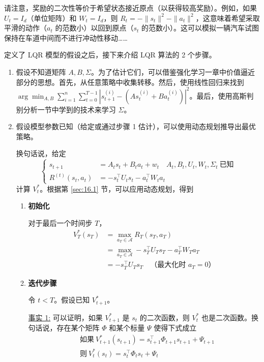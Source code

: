 \begin{remark*}
    请注意，奖励的二次性等价于希望状态接近原点（以获得较高奖励）。例如，如果 $U_t = I_d$（单位矩阵）和 $W_t = I_d$，则 $R_t = -\|s_t\|^2 - \|a_t\|^2$，这意味着希望采取平滑的动作（$a_t$ 的范数小）以回到原点（$s_t$ 的范数小）。这可以模拟一辆汽车试图保持在车道中间而不进行冲动性移动……
\end{remark*}

定义了 LQR 模型的假设之后，接下来介绍 LQR 算法的 2 个步骤。

\begin{enumerate}[label=\textbf{步骤 \arabic*}]
    \item 假设不知道矩阵 $A, B, \Sigma$。为了估计它们，可以借鉴强化学习一章中价值逼近部分的思想。首先，从任意策略中收集转移。然后，使用线性回归来找到 $\arg\min_{A,B} \sum_{i=1}^n \sum_{t=0}^{T-1} \left|s_{t+1}^{(i)} - \left(A s_t^{(i)} + B a_t^{(i)}\right)\right|^2$。最后，使用高斯判别分析一节中学到的技术来学习 $\Sigma$。
    \item 假设模型参数已知（给定或通过步骤 1 估计），可以使用动态规划推导出最优策略。
    
    换句话说，给定
    \[\begin{cases}
        s_{t+1} &= A_t s_t + B_t a_t + w_t \quad A_t, B_t, U_t, W_t, \Sigma_t \ \text{已知}\\
        R^{(t)}(s_t, a_t) &= -s_t^\top U_t s_t - a_t^\top W_t a_t
    \end{cases}\]
    计算 $V_t^*$。根据第 \ref{sec:16.1} 节，可以应用动态规划，得到
    \begin{enumerate}[label=\arabic*.]
        \item \textbf{初始化}
        
        对于最后一个时间步 $T$，
        \begin{align*}
            V_T^*(s_T)
            &= \max_{a_T \in \mathcal{A}} R_T(s_T, a_T) \\
            &= \max_{a_T \in \mathcal{A}} -s_T^\top U_T s_T - a_T^\top W_T a_T\\
            &= -s_T^\top U_T s_T \quad \text{（最大化时 $a_T=0$）}
        \end{align*}
            
        \item \textbf{迭代步骤}
        
        令 $t < T$。假设已知 $V_{t+1}^*$。

        \underline{事实 1:} 可以证明，如果 $V_{t+1}^*$ 是 $s_t$ 的二次函数，则 $V_t^*$ 也是二次函数。换句话说，存在某个矩阵 $\Phi$ 和某个标量 $\Psi$ 使得下式成立
        \begin{align*}
            &\text{如果}\  V_{t+1}^*(s_{t+1}) = s_{t+1}^\top \Phi_{t+1} s_{t+1} + \Psi_{t+1} \\
            &\text{则}\  V_t^*(s_t) = s_t^\top \Phi_t s_t + \Psi_t
        \end{align*}


\end{enumerate}
\end{enumerate}
